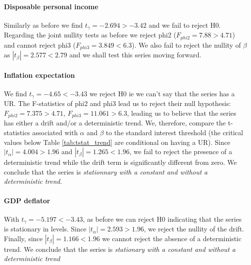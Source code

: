 \documentclass[hidelinks,12pts]{article}
\DeclareMathOperator{\1}{\mathbbm{1}}
\begin{document}
\paragraph{Disposable personal income}
Similarly as before we find $t_\gamma = -2.694 > -3.42$ and we fail to reject H0. 
Regarding the joint nullity tests as before we reject phi2 ($F_{phi2} = 7.88 > 4.71$) and cannot reject phi3 ($F_{phi3} = 3.849 < 6.3$). 
We also fail to reject the nullity of $\beta$ as $|t_\beta| = 2.577 < 2.79$ and we shall test this series moving forward. 


\paragraph{Inflation expectation} 
We find $t_\gamma = -4.65 < -3.43$ we reject H0 ie we can't say that the series has a UR. 
The F-statistics of phi2 and phi3 lead us to reject their null hypothesis: $F_{phi2} = 7.375 > 4.71$, $F_{phi3} = 11.061 > 6.3$, leading us to believe that the series has either a drift and/or a deterministic trend. 
We, therefore, compare the t-statistics associated with $\alpha$ and $\beta$ to the standard interest threshold (the critical values below Table \ref{tab:tstat_trend} are conditional on having a UR). Since $|t_\alpha| = 4.004 > 1.96$ and $|t_\beta| = 1.265 < 1.96$, we fail to reject the presence of a deterministic trend while the drift term is significantly different from zero. 
We conclude that the series is \emph{stationnary with a constant and without a deterministic trend}.


    

\paragraph{GDP deflator}
With $t_\gamma = -5.197 < -3.43$, as before we can reject H0 indicating that the series is stationary in levels. 
Since $|t_\alpha| = 2.593 > 1.96$, we reject the nullity of the drift. 
Finally, since $|t_\beta| = 1.166 < 1.96$ we cannot reject the absence of a deterministic trend.  
We conclude that the series is \emph{stationary with a constant and without a deterministic trend}
\end{document}
